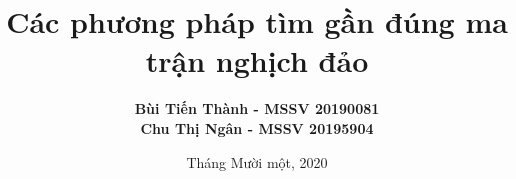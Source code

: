 \documentclass[16pt, hyperref={unicode}]{beamer}
\title{Các phương pháp tìm gần đúng ma trận nghịch đảo}
\author{\textbf{Bùi Tiến Thành - MSSV 20190081}  \\\textbf{Chu Thị Ngân - MSSV 20195904} \\}
\institute{CTTN Toán tin K64}
\date{Tháng Mười một, 2020}
\begin{document}
    \begin{frame}
        \maketitle 
    \end{frame}
    
    
    
    
    
    
    
\end{document}
